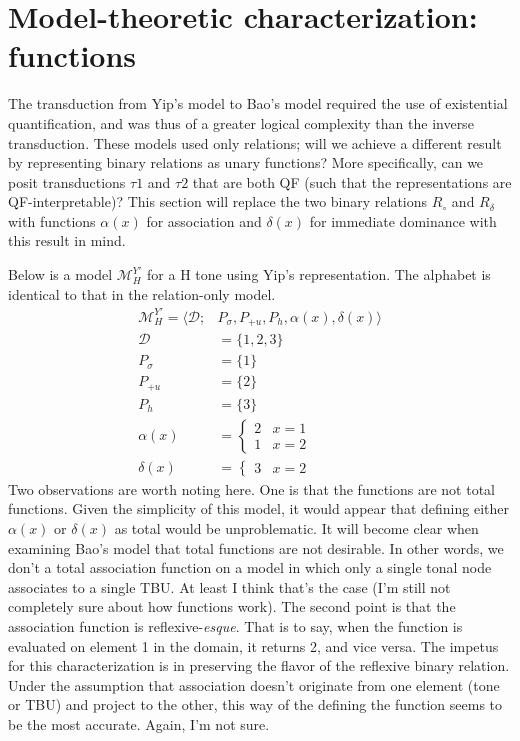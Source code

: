 \documentclass{article}
\begin{document}
\section{Model-theoretic characterization: functions}
The transduction from Yip's model to Bao's model required the use of existential quantification, and was thus of a greater logical complexity than the inverse transduction. These models used only relations; will we achieve a different result by representing binary relations as unary functions? More specifically, can we posit transductions $\tau1$ and $\tau2$ that are both QF (such that the representations are QF-interpretable)? This section will replace the two binary relations $R_{\circ}$ and $R_{\delta}$ with functions $\alpha(x)$ for association and $\delta(x)$ for immediate dominance with this result in mind. \par
Below is a model $\mathcal{M}^{Y'}_{H}$ for a H tone using Yip's representation. The alphabet is identical to that in the relation-only model.
 \begin{equation}
\begin{split}
\mathcal{M}^{Y'}_{H} = \langle \mathcal{D}; &P_{\sigma}, P_{+u}, P_{h}, \alpha(x), \delta(x) \rangle \\
\mathcal{D} &= \{1, 2, 3\} \\
P_{\sigma} &= \{1\} \\
P_{+u} &= \{2\} \\
P_{h} &= \{3\} \\
\alpha(x) &= \begin{cases} 2 & x=1 \\
				     1 & x=2  \end{cases} \\
\delta(x) &= \begin{cases} 3 & x = 2 \end{cases} 
\end{split}
\end{equation}
Two observations are worth noting here. One is that the functions are not total functions. Given the simplicity of this model, it would appear that defining either $\alpha(x)$ or $\delta(x)$ as total would be unproblematic. It will become clear when examining Bao's model that total functions are not desirable. In other words, we don't a total association function on a model in which only a single tonal node associates to a single TBU. At least I think that's the case (I'm still not completely sure about how functions work). The second point is that the association function is reflexive-\emph{esque}. That is to say, when the function is evaluated on element 1 in the domain, it returns 2, and vice versa. The impetus for this characterization is in preserving the flavor of the reflexive binary relation. Under the assumption that association doesn't originate from one element (tone or TBU) and project to the other, this way of the defining the function seems to be the most accurate. Again, I'm not sure. \par
\end{document}
